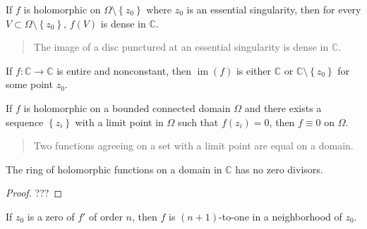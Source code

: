 \begin{theorem}\label{Casorati}

If \(f\) is holomorphic on \(\Omega\setminus\left\{{z_0}\right\}\) where
\(z_0\) is an essential singularity, then for every
\(V\subset \Omega\setminus\left\{{z_0}\right\}\), \(f(V)\) is dense in
\({\mathbb{C}}\).

\begin{quote}
The image of a disc punctured at an essential singularity is dense in
\({\mathbb{C}}\).
\end{quote}

\end{theorem}

\begin{theorem}

If \(f:{\mathbb{C}}\to {\mathbb{C}}\) is entire and nonconstant, then
\(\operatorname{im}(f)\) is either \({\mathbb{C}}\) or
\({\mathbb{C}}\setminus\left\{{z_0}\right\}\) for some point \(z_0\).

\end{theorem}


\begin{theorem}

If \(f\) is holomorphic on a bounded connected domain \(\Omega\) and
there exists a sequence \(\left\{{z_i}\right\}\) with a limit point in
\(\Omega\) such that \(f(z_i) = 0\), then \(f\equiv 0\) on \(\Omega\).

\begin{quote}
Two functions agreeing on a set with a limit point are equal on a
domain.
\end{quote}

\end{theorem}

\begin{corollary}

The ring of holomorphic functions on a domain in \({\mathbb{C}}\) has no
zero divisors.

\end{corollary}

\begin{proof}

???

\end{proof}


\begin{proposition}

If \(z_0\) is a zero of \(f'\) of order \(n\), then \(f\) is
\((n+1)\)-to-one in a neighborhood of \(z_0\).

\end{proposition}

